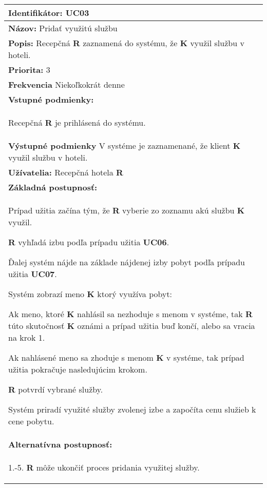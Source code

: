 \begin{center}
\centering
\begin{tabularx}{\textwidth}{| X |}
  \hline
  \textbf{Identifikátor:} UC03\\
  \hline
  \textbf{Názov:} Pridať využitú službu\\
  \hline
  \textbf{Popis:} Recepčná \textbf{R} zaznamená do systému, že \textbf{K} využil službu v hoteli. \\
  \hline
  \textbf{Priorita:} 3 \\
  \hline
  \textbf{Frekvencia} Niekoľkokrát denne \\
  \hline
  \textbf{Vstupné podmienky:} \\
  \begin{compactenum}
  	\item Recepčná \textbf{R} je prihlásená do systému.
  \end{compactenum}\\
  \hline
  \textbf{Výstupné podmienky} V systéme je zaznamenané, že klient \textbf{K} využil službu v hoteli. \\
  \hline
  \textbf{Užívatelia:} Recepčná hotela \textbf{R}\\ %
  \hline
  \textbf{Základná postupnosť:} \\
  \begin{compactenum}
    \item Prípad užitia začína tým, že \textbf{R} vyberie zo zoznamu akú službu \textbf{K} využil.
    \item \textbf{R} vyhľadá izbu podľa prípadu užitia \textbf{UC06}. 
    \item Ďalej systém nájde na základe nájdenej izby pobyt podľa prípadu užitia \textbf{UC07}.
    \item Systém zobrazí meno \textbf{K} ktorý využíva pobyt:
      \begin{compactenum}
      \item Ak meno, ktoré \textbf{K} nahlásil sa nezhoduje s menom v systéme, tak \textbf{R} túto skutočnosť \textbf{K} 
        oznámi a prípad užitia buď končí, alebo sa vracia na krok 1.
      \item Ak nahlásené meno sa zhoduje s menom \textbf{K} v systéme, tak prípad užitia pokračuje nasledujúcim krokom.
      \end{compactenum}
    \item \textbf{R} potvrdí vybrané služby.   
    \item Systém priradí využité služby zvolenej izbe a započíta cenu služieb k cene pobytu.
  \end{compactenum}\\
  \hline
  \textbf{Alternatívna postupnosť:} \\
  \begin{compactenum}
    \item[1.-5.] \textbf{R} môže ukončiť proces pridania využitej služby.
  \end{compactenum}\\
  \hline
\end{tabularx}
\end{center}
